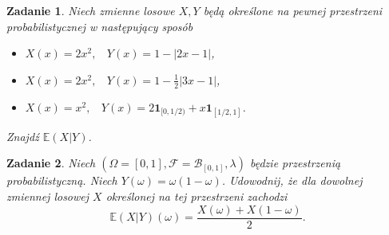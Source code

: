 \documentclass{mwart}
\newtheorem{zd}{Zadanie}
\begin{document}
\begin{zd}
	Niech zmienne losowe $X,Y$ będą określone na pewnej przestrzeni probabilistycznej w następujący sposób
	\begin{itemize}
	\item $X(x) = 2x^2,\ \ \ \ Y(x) = 1 - |2x - 1|$,
	\item $X(x) = 2x^2, \ \ \ \ Y(x) = 1 - \frac{1}{2}\left|3x-1\right|$,
	\item $X(x) = x^2, \ \ \ \ Y(x) = 2\pmb{1}_{[0, 1/2)} + x\pmb{1}_{[1/2, 1]}$.
	\end{itemize}
	Znajdź $\mathbb{E}(X|Y)$.
\end{zd}

\begin{zd}
	Niech $(\Omega = [0,1], \mathcal{F} = \mathcal{B}_{[0,1]}, \lambda)$ będzie przestrzenią probabilistyczną. Niech $Y(\omega) = \omega(1-\omega)$. Udowodnij, że dla dowolnej zmiennej losowej $X$ określonej na tej przestrzeni zachodzi
	\begin{displaymath}
	 \mathbb{E}(X|Y)(\omega) = \frac{X(\omega) + X(1-\omega)}{2}.
	\end{displaymath}
\end{zd}
\end{document}
